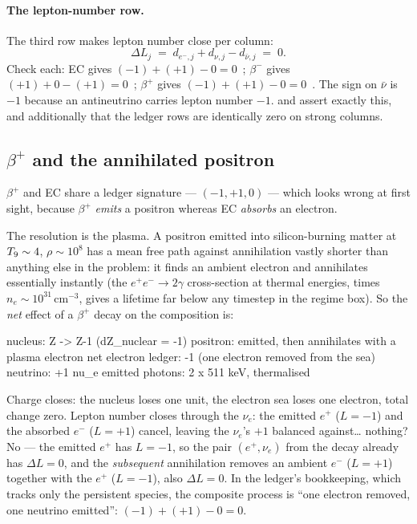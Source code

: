 \paragraph{The lepton-number row.} The third row makes lepton number close per
column:
%
\begin{equation}
\Delta L_j \;=\; d_{e^-,j} + d_{\nu,j} - d_{\bar\nu,j} \;=\; 0.
\label{eq:leptonclose}
\end{equation}
%
Check each: EC gives $(-1) + (+1) - 0 = 0$~\yes; $\beta^-$ gives
$(+1) + 0 - (+1) = 0$~\yes; $\beta^+$ gives $(-1) + (+1) - 0 = 0$~\yes. The sign
on $\bar\nu$ is $-1$ because an antineutrino carries lepton number $-1$.
 and
 assert exactly this, and
additionally that the ledger rows are identically zero on strong columns.

\subsection{\texorpdfstring{$\beta^+$}{beta+} and the annihilated positron}
\label{sec:betaplus}

$\beta^+$ and EC share a ledger signature --- $(-1, +1, 0)$ --- which looks
wrong at first sight, because $\beta^+$ \emph{emits} a positron whereas EC
\emph{absorbs} an electron.

The resolution is the plasma. A positron emitted into silicon-burning matter at
$T_{9} \sim 4$, $\rho \sim 10^{8}$ has a mean free path against annihilation
vastly shorter than anything else in the problem: it finds an ambient electron
and annihilates essentially instantly (the $e^+e^- \to 2\gamma$ cross-section at
thermal energies, times $n_e \sim 10^{31}$\,cm$^{-3}$, gives a lifetime far
below any timestep in the regime box). So the \emph{net} effect of a $\beta^+$
decay on the composition is:

\begin{srclisting}
  nucleus:      Z -> Z-1              (dZ_nuclear = -1)
  positron:     emitted, then annihilates with a plasma electron
  net electron ledger:  -1           (one electron removed from the sea)
  neutrino:     +1 nu_e emitted
  photons:      2 x 511 keV, thermalised
\end{srclisting}

Charge closes: the nucleus loses one unit, the electron sea loses one electron,
total change zero. Lepton number closes through the $\nu_e$: the emitted $e^+$
($L = -1$) and the absorbed $e^-$ ($L = +1$) cancel, leaving the $\nu_e$'s $+1$
balanced against\ldots{} nothing? No --- the emitted $e^+$ has $L = -1$, so the
pair $(e^+, \nu_e)$ from the decay already has $\Delta L = 0$, and the
\emph{subsequent} annihilation removes an ambient $e^-$ ($L = +1$) together with
the $e^+$ ($L = -1$), also $\Delta L = 0$. In the ledger's bookkeeping, which
tracks only the persistent species, the composite process is ``one electron
removed, one neutrino emitted'': $(-1) + (+1) - 0 = 0$.~\yes


